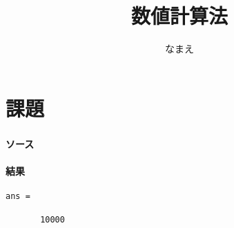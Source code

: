 \documentclass[11pt,a4paper,a4j]{jsarticle}
\title{数値計算法}
\author{なまえ}
\begin{document}
\maketitle

\part*{課題}
\section{}
\subsection{ソース}


\subsection{結果}
\begin{lstlisting}
ans =

       10000

\end{lstlisting}
\end{document}
